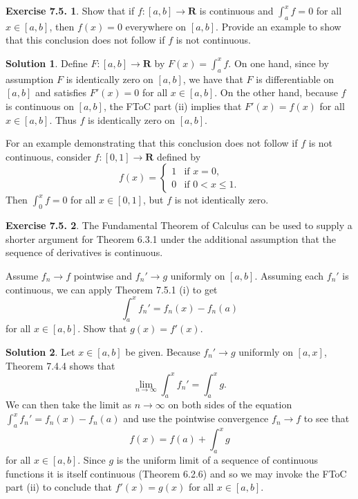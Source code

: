 \documentclass[12pt]{article}
\theoremstyle{definition}
\theoremstyle{exercise}
\newtheorem{exercise}{Exercise 7.5.}
\theoremstyle{solution}
\newtheorem*{solution}{Solution}
\newcommand{\R}{\mathbf{R}}
\begin{document}
\begin{exercise}
\label{ex:4}
    Show that if \( f : [a, b] \to \R \) is continuous and \( \int_a^x f = 0 \) for all \( x \in [a, b] \), then \( f(x) = 0 \) everywhere on \( [a, b] \). Provide an example to show that this conclusion does not follow if \( f \) is not continuous.
\end{exercise}

\begin{solution}
    Define \( F : [a, b] \to \R \) by \( F(x) = \int_a^x f \). On one hand, since by assumption \( F \) is identically zero on \( [a, b] \), we have that \( F \) is differentiable on \( [a, b] \) and satisfies \( F'(x) = 0 \) for all \( x \in [a, b] \). On the other hand, because \( f \) is continuous on \( [a, b] \), the FToC part (ii) implies that \( F'(x) = f(x) \) for all \( x \in [a, b] \). Thus \( f \) is identically zero on \( [a, b] \).

    For an example demonstrating that this conclusion does not follow if \( f \) is not continuous, consider \( f : [0, 1] \to \R \) defined by
    \[
        f(x) = \begin{cases}
            1 & \text{if } x = 0, \\
            0 & \text{if } 0 < x \leq 1.
        \end{cases}
    \]
    Then \( \int_0^x f = 0 \) for all \( x \in [0, 1] \), but \( f \) is not identically zero.
\end{solution}

\begin{exercise}
\label{ex:5}
    The Fundamental Theorem of Calculus can be used to supply a shorter argument for Theorem 6.3.1 under the additional assumption that the sequence of derivatives is continuous.

    Assume \( f_n \to f \) pointwise and \( f_n' \to g \) uniformly on \( [a, b] \). Assuming each \( f_n' \) is continuous, we can apply Theorem 7.5.1 (i) to get
    \[
        \int_a^x f_n' = f_n(x) - f_n(a)
    \]
    for all \( x \in [a, b] \). Show that \( g(x) = f'(x) \).
\end{exercise}

\begin{solution}
    Let \( x \in [a, b] \) be given. Because \( f_n' \to g \) uniformly on \( [a, x] \), Theorem 7.4.4 shows that
    \[
        \lim_{n \to \infty} \int_a^x f_n' = \int_a^x g.
    \]
    We can then take the limit as \( n \to \infty \) on both sides of the equation \( \int_a^x f_n' = f_n(x) - f_n(a) \) and use the pointwise convergence \( f_n \to f \) to see that
    \[
        f(x) = f(a) + \int_a^x g
    \]
    for all \( x \in [a, b] \). Since \( g \) is the uniform limit of a sequence of continuous functions it is itself continuous (Theorem 6.2.6) and so we may invoke the FToC part (ii) to conclude that \( f'(x) = g(x) \) for all \( x \in [a, b] \).
\end{solution}
\end{document}
